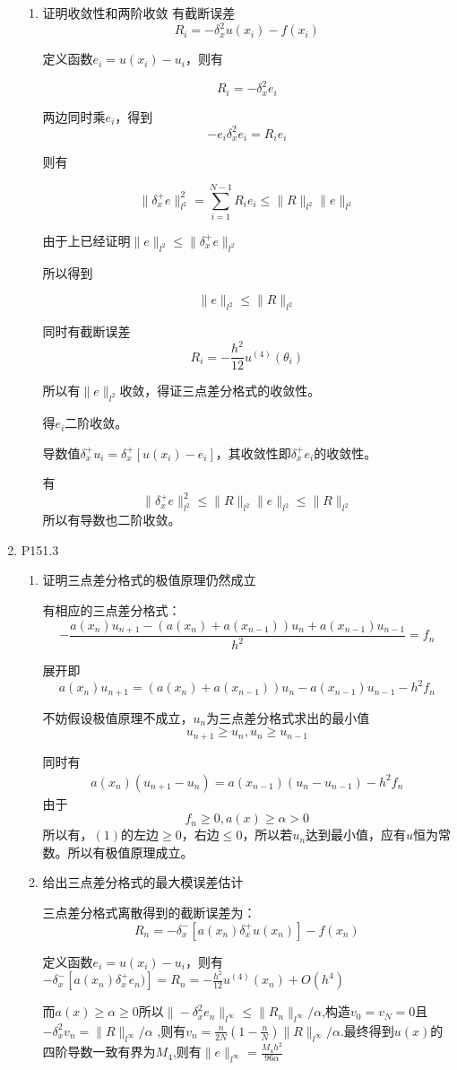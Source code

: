 \documentclass{ctexart}
\begin{document}
\begin{enumerate}
\begin{enumerate}
\item  证明收敛性和两阶收敛
有截断误差
\[
R_i=-\delta_x^2 u(x_i)-f(x_i)\]

定义函数\(e_i=u(x_i)-u_i\)，则有

\[R_i=-\delta_x^2 e_i\]

两边同时乘\(e_i\)，得到
\[
-e_i \delta_x^2 e_i=R_ie_i\]

则有

\[
\| \delta_x^+ e\|^2_{l^2}=\sum_{i=1}^{N-1} R_ie_i \leq \|R\|_{l^2}\|e\|_{l^2}
\]

由于上已经证明\(\|e\|_{l^2} \leq \| \delta_x^+ e \|_{l^2}\)

所以得到

\[
\|e\|_{l^2} \leq \|R\|_{l^2}
\]

同时有截断误差
\[
R_i = -\frac{h^2}{12}u^{(4)}(\theta_i) 
\]

所以有\(\|e\|_{l^2}\)收敛，得证三点差分格式的收敛性。

得\(e_i\)二阶收敛。

导数值\(\delta_x^+ u_i=\delta_x^+[u(x_i)-e_i]\)，其收敛性即\(\delta_x^+ e_i\)的收敛性。

有
\[
 \| \delta_x^+ e \| ^2_{l^2} \leq \|R\|_{l^2} \| e \|_{l^2} \leq \|R\|_{l^2} 
\]
所以有导数也二阶收敛。

\end{enumerate}

\item P151.3

\begin{enumerate}
\item 证明三点差分格式的极值原理仍然成立

有相应的三点差分格式：
\[
-\frac{a(x_n)u_{n+1}-(a(x_n)+a(x_{n-1}))u_n+a(x_{n-1})u_{n-1}}{h^2}=f_n
\]

展开即
\[
a(x_n)u_{n+1}=(a(x_n)+a(x_{n-1}))u_n-a(x_{n-1})u_{n-1}-h^2f_n
\]

不妨假设极值原理不成立，\(u_n\)为三点差分格式求出的最小值
\[
u_{n+1} \geq u_n , u_n \geq u_{n-1}
\]

同时有
\begin{eqnarray}
a(x_n)(u_{n+1}-u_n)=a(x_{n-1})(u_n-u_{n-1})-h^2f_n
\end{eqnarray}
由于
\[
f_n \geq 0,a(x)\geq \alpha >0
\]
所以有，\((1)\)的左边\(\geq 0\)，右边\(\leq 0\)，所以若\(u_n\)达到最小值，应有\(u\)恒为常数。所以有极值原理成立。


\item 给出三点差分格式的最大模误差估计

三点差分格式离散得到的截断误差为：
\[
R_n = - \delta_x^-[a(x_n)\delta_x^+u(x_n)]-f(x_n)\]

定义函数\(e_i=u(x_i)-u_i\)，则有\(-\delta_x^-[a(x_n)\delta_x^+e_n)]=R_n=-\frac{h^2}{12}u^{(4)}(x_n)+O(h^4)\)
 
 而\(a(x) \geq \alpha \geq 0\)所以\( \| - \delta^2_x e_n\|_{l^\infty} \leq \|R_n\|_{l^\infty}/ \alpha\),构造\(v_0=v_N=0\)且\(-\delta^2_x v_n=\|R\|_{l^\infty}/\alpha\)
,则有\(v_n=\frac{n}{2N}(1-\frac{n}{N})\|R\|_{l^\infty}/\alpha\).最终得到\(u(x)\)的四阶导数一致有界为\(M_4\),则有\(\|e\|_{l^\infty}=\frac{M_4h^2}{96\alpha}\)

\end{enumerate}
\end{enumerate}
\end{document}
